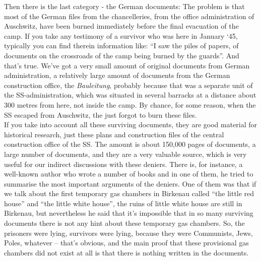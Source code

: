 Then there is the last category - the German documents: The problem is that most of the German files from the chancelleries, from the office administration of Auschwitz, have been burned immediately before the final evacuation of the camp. If you take any testimony of a survivor who was here in January ‘45, typically you can find therein information like: ``I saw the piles of papers, of documents on the crossroads of the camp being burned by the guards''. And that's true. We've got a very small amount of original documents from German administration, a relatively large amount of documents from the German construction office, the \textit{Bauleitung}, probably because that was a separate unit of the SS-administration, which was situated in several barracks at a distance about 300 metres from here, not inside the camp. By chance, for some reason, when the SS escaped from Auschwitz, the just forgot to burn these files. \\
If you take into account all these surviving documents, they are good material for historical research, just these plans and construction files of the central construction office of the SS. The amount is about 150,000 pages of documents, a large number of documents, and they are a very valuable source, which is very useful for our indirect discussions with these deniers. There is, for instance, a well-known author who wrote a number of books and in one of them, he tried to summarise the most important arguments of the deniers. One of them was that if we talk about the first temporary gas chambers in Birkenau called ``the little red house'' and ``the little white house'', the ruins of little white house are still in Birkenau, but nevertheless he said that it’s impossible that in so many surviving documents there is not any hint about these temporary gas chambers. So, the prisoners were lying, survivors were lying, because they were Communists, Jews, Poles, whatever – that’s obvious, and the main proof that these provisional gas chambers did not exist at all is that there is nothing written in the documents.\\ 
